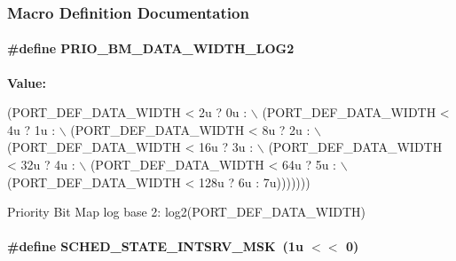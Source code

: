 \subsubsection{Macro Definition Documentation}
\hypertarget{group__kern__impl_ga4a1ac440197aa9f2d77edf92c5b3b83c}{
\paragraph[{P\-R\-I\-O\-\_\-\-B\-M\-\_\-\-D\-A\-T\-A\-\_\-\-W\-I\-D\-T\-H\-\_\-\-L\-O\-G2}]{\setlength{\rightskip}{0pt plus 5cm}\#define P\-R\-I\-O\-\_\-\-B\-M\-\_\-\-D\-A\-T\-A\-\_\-\-W\-I\-D\-T\-H\-\_\-\-L\-O\-G2}}\label{group__kern__impl_ga4a1ac440197aa9f2d77edf92c5b3b83c}
{\bfseries Value\-:}
\begin{DoxyCode}
(PORT\_DEF\_DATA\_WIDTH <   2u ? 0u :                                          \(\backslash\)
     (PORT\_DEF\_DATA\_WIDTH <   4u ? 1u :                                         \(\backslash\)
      (PORT\_DEF\_DATA\_WIDTH <   8u ? 2u :                                        \(\backslash\)
       (PORT\_DEF\_DATA\_WIDTH <  16u ? 3u :                                       \(\backslash\)
        (PORT\_DEF\_DATA\_WIDTH <  32u ? 4u :                                      \(\backslash\)
         (PORT\_DEF\_DATA\_WIDTH <  64u ? 5u :                                     \(\backslash\)
          (PORT\_DEF\_DATA\_WIDTH < 128u ? 6u : 7u)))))))
\end{DoxyCode}


Priority Bit Map log base 2\-: {\ttfamily log2(\-P\-O\-R\-T\-\_\-\-D\-E\-F\-\_\-\-D\-A\-T\-A\-\_\-\-W\-I\-D\-T\-H)} 

\hypertarget{group__kern__impl_ga11143896be344ab4dd20f6eb690918e7}{
\paragraph[{S\-C\-H\-E\-D\-\_\-\-S\-T\-A\-T\-E\-\_\-\-I\-N\-T\-S\-R\-V\-\_\-\-M\-S\-K}]{\setlength{\rightskip}{0pt plus 5cm}\#define S\-C\-H\-E\-D\-\_\-\-S\-T\-A\-T\-E\-\_\-\-I\-N\-T\-S\-R\-V\-\_\-\-M\-S\-K~(1u $<$$<$ 0)}}\label{group__kern__impl_ga11143896be344ab4dd20f6eb690918e7}


